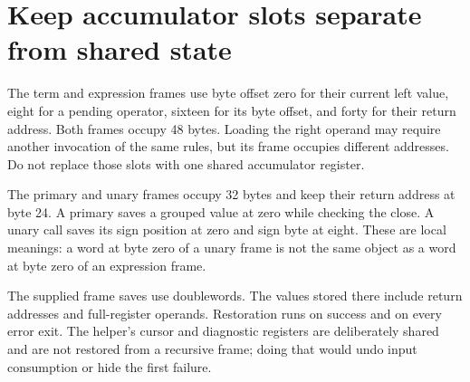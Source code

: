 \section{Keep accumulator slots separate from shared state}\label{expression-slots}
The term and expression frames use byte offset zero for their current left value,
eight for a pending operator, sixteen for its byte offset, and forty for their
return address. Both frames occupy 48 bytes. Loading the right operand may require
another invocation of the same rules, but its frame occupies different addresses.
Do not replace those slots with one shared accumulator register.

The primary and unary frames occupy 32 bytes and keep their return address at byte
24. A primary saves a grouped value at zero while checking the close. A unary call
saves its sign position at zero and sign byte at eight. These are local meanings:
a word at byte zero of a unary frame is not the same object as a word at byte zero
of an expression frame.

The supplied frame saves use doublewords. The values stored there include return
addresses and full-register operands. Restoration runs on success and on every error
exit. The helper's cursor and diagnostic registers are deliberately shared and are
not restored from a recursive frame; doing that would undo input consumption or hide
the first failure.
